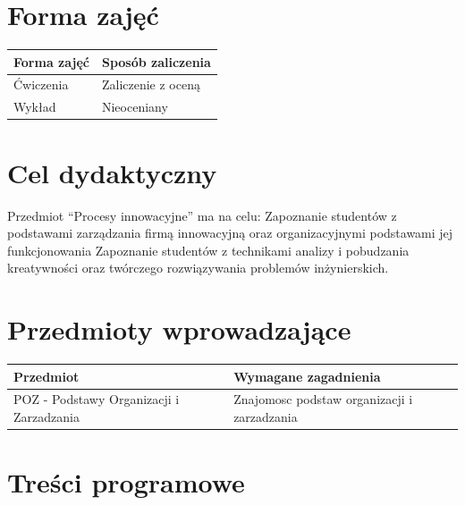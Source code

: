 \documentclass[12pt, a4paper]{article}
\begin{document}
\section{Forma zajęć}

\begin{tabular}{ll}
  \hline
  \textbf{Forma zajęć} & \textbf{Sposób zaliczenia} \\
  \hline
  Ćwiczenia & Zaliczenie z oceną \\
  Wykład & Nieoceniany \\
  \hline
\end{tabular}

\section{Cel dydaktyczny}

Przedmiot “Procesy innowacyjne” ma na celu: Zapoznanie studentów z podstawami zarządzania firmą innowacyjną oraz organizacyjnymi podstawami jej funkcjonowania Zapoznanie studentów z technikami analizy i pobudzania kreatywności oraz twórczego rozwiązywania problemów inżynierskich.

\section{Przedmioty wprowadzające}

\begin{tabularx}{\textwidth}{lX}
  \hline
  \textbf{Przedmiot} & \textbf{Wymagane zagadnienia} \\
  \hline
  POZ - Podstawy Organizacji i Zarzadzania & Znajomosc podstaw organizacji i zarzadzania \\
  \hline
\end{tabularx}

\section{Treści programowe}
\end{document}

